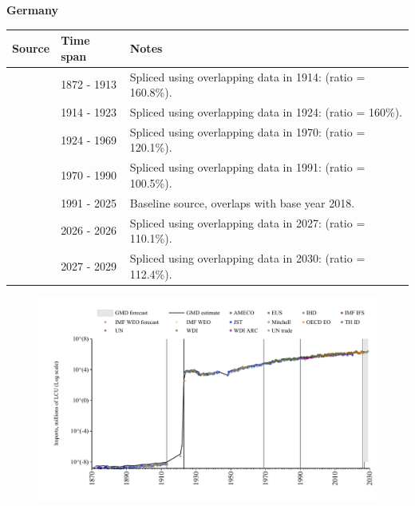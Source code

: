 \documentclass[12pt,a4paper,landscape]{article}
\begin{document}
\begin{adjustbox}{max totalsize={\paperwidth}{\paperheight},center}
\begin{minipage}[t][\textheight][t]{\textwidth}
\vspace*{0.5cm}
{}
\begin{center}
{\Large\bfseries Germany}
\end{center}
\vspace{0.5cm}
\begin{table}[H]
\centering
\small
\begin{tabular}{|l|l|l|}
\hline
\textbf{Source} & \textbf{Time span} & \textbf{Notes} \\
\hline
\rowcolor{white}\cite{JST}& 1872 - 1913 &Spliced using overlapping data in 1914: (ratio = 160.8\%).\\
\rowcolor{lightgray}\cite{UN_trade}& 1914 - 1923 &Spliced using overlapping data in 1924: (ratio = 160\%).\\
\rowcolor{white}\cite{JST}& 1924 - 1969 &Spliced using overlapping data in 1970: (ratio = 120.1\%).\\
\rowcolor{lightgray}\cite{WDI}& 1970 - 1990 &Spliced using overlapping data in 1991: (ratio = 100.5\%).\\
\rowcolor{white}\cite{OECD_EO}& 1991 - 2025 &Baseline source, overlaps with base year 2018.\\
\rowcolor{lightgray}\cite{AMECO}& 2026 - 2026 &Spliced using overlapping data in 2027: (ratio = 110.1\%).\\
\rowcolor{white}\cite{IMF_WEO_forecast}& 2027 - 2029 &Spliced using overlapping data in 2030: (ratio = 112.4\%).\\
\hline
\end{tabular}
\end{table}
\begin{figure}[H]
\centering
\includegraphics[width=\textwidth,height=0.6\textheight,keepaspectratio]{graphs/DEU_imports.pdf}
\end{figure}
\end{minipage}
\end{adjustbox}
\end{document}
